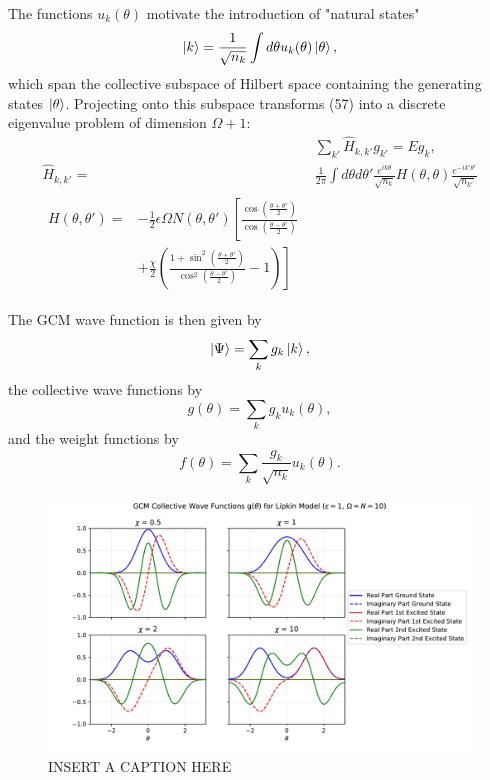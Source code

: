 \documentclass[prb,aps,twocolumn,showpacs,10pt]{revtex4-2}
\begin{document}
The functions $u_k(\theta)$ motivate the introduction of "natural states"
\begin{equation}
\ket{k} = \frac{1}{\sqrt{n_k}} \int d\theta u_k(\theta) \ket{\theta},
\end{equation}
which span the collective subspace of Hilbert space containing the generating states $\ket{\theta}$. Projecting onto this subspace transforms (57) into a discrete eigenvalue problem of dimension $\Omega+1$:
\begin{align}
&\sum_{k'}\hat{H}_{k,k'} g_{k'} = E g_k,\\
\hat{H}_{k,k'} = &\frac{1}{2\pi} \int d\theta d\theta' \frac{e^{ik\theta}}{\sqrt{n_k}} H(\theta, \theta) \frac{e^{-ik'\theta'}}{\sqrt{n_{k'}}}\\
\begin{split}
H(\theta, \theta') = &-\frac{1}{2}\epsilon \Omega N(\theta, \theta') \left[ \frac{\cos\left( \frac{\theta+\theta'}{2} \right)}{\cos\left( \frac{\theta-\theta'}{2} \right)} \right.\\
&+\left.
\frac{\chi}{2} \left( \frac{1+\sin^2\left( \frac{\theta+\theta'}{2} \right)}{\cos^2\left( \frac{\theta-\theta'}{2} \right)}-1 \right)
\right]
\end{split}
\end{align}

The GCM wave function is then given by
\begin{equation}
\ket{\Psi} = \sum_k g_k \ket{k},
\end{equation}
the collective wave functions by
\begin{equation}
g(\theta) = \sum_k g_k u_k(\theta),
\end{equation}
and the weight functions by
\begin{equation}
f(\theta) = \sum_k \frac{g_k}{\sqrt{n_k}} u_k(\theta).
\end{equation}

\begin{figure}
  \includegraphics[width=\textwidth]{../figures/plot_gcm_wvfuncs.pdf}
  \caption{INSERT A CAPTION HERE}
\end{figure}
\end{document}
